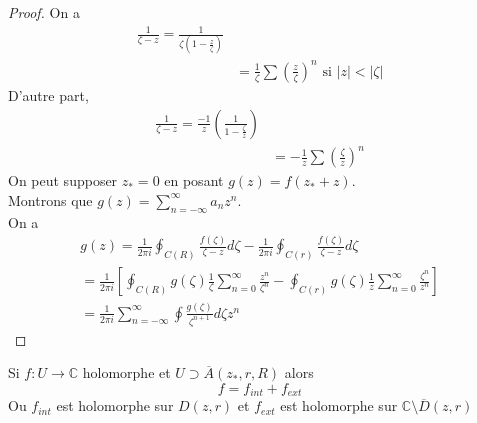 \documentclass[../main.tex]{subfiles}
\begin{document}
\begin{proof}
On a 
\begin{align*}
\frac{1}{\zeta-z} = \frac{1}{\zeta ( 1-\frac{z}{\zeta}) } \\
&= \frac{1}{\zeta} \sum ( \frac{z}{\zeta}) ^{n} \text{ si } |z|<|\zeta|
\end{align*}
D'autre part, 
\begin{align*}
\frac{1}{\zeta-z} = \frac{-1}{z}( \frac{1}{1-\frac{\zeta}{z}}) \\
&= -\frac{1}{z} \sum \left( \frac{\zeta}{z} \right)^{n}
\end{align*}
On peut supposer $z_*=0$ en posant $g( z) = f( z_*+z) $.\\
Montrons que $g( z) = \sum_{n= - \infty }^{ \infty } a_n z^{n}$.\\
On a
\begin{align*}
g( z) = \frac{1}{2\pi i} \oint_{C( R) } \frac{f( \zeta) }{\zeta-z}d\zeta - \frac{1}{2\pi i} \oint_{C( r) } \frac{f( \zeta) }{\zeta-z}d\zeta\\
= \frac{1}{2\pi i} \left[\oint_{C( R) } g( \zeta) \frac{1}{\zeta} \sum_{n=0}^{ \infty }\frac{z^{n}}{\zeta^{n}} - \oint_{C( r) } g( \zeta) \frac{1}{z} \sum_{n=0}^{ \infty }\frac{\zeta^{n}}{z^{n}}\right] \\
= \frac{1}{2\pi i} \sum_{n= - \infty }^{ \infty }\oint \frac{g( \zeta) }{\zeta^{n+1}} d\zeta z^{n}
\end{align*}

\end{proof}
\begin{crly}
Si $f:U\to \mathbb{C}$ holomorphe et $ U \supset \overline{A}( z_*,r,R)$ alors
\[ 
f= f_{int}  + f_{ext} 
\]
Ou $f_{int} $ est holomorphe sur $D( z,r)  $ et $ f_{ext} $ est holomorphe sur $ \mathbb{C}\setminus \overline{D}( z,r)  $ 	
\end{crly}
\end{document}
